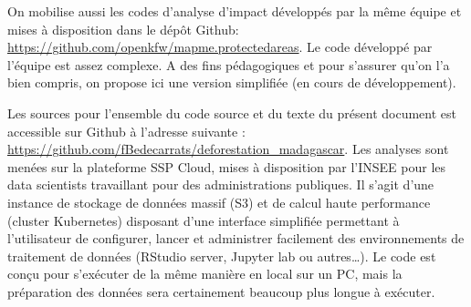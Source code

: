 \documentclass[
  letterpaper,
  DIV=11,
  numbers=noendperiod]{scrreprt}
\begin{document}
On mobilise aussi les codes d'analyse d'impact développés par la même
équipe et mises à disposition dans le dépôt Github:
\url{https://github.com/openkfw/mapme.protectedareas}. Le code développé
par l'équipe est assez complexe. A des fins pédagogiques et pour
s'assurer qu'on l'a bien compris, on propose ici une version simplifiée
(en cours de développement).

Les sources pour l'ensemble du code source et du texte du présent
document est accessible sur Github à l'adresse suivante :
\url{https://github.com/fBedecarrats/deforestation_madagascar}. Les
analyses sont menées sur la plateforme SSP Cloud, mises à disposition
par l'INSEE pour les data scientists travaillant pour des
administrations publiques. Il s'agit d'une instance de stockage de
données massif (S3) et de calcul haute performance (cluster Kubernetes)
disposant d'une interface simplifiée permettant à l'utilisateur de
configurer, lancer et administrer facilement des environnements de
traitement de données (RStudio server, Jupyter lab ou autres\ldots). Le
code est conçu pour s'exécuter de la même manière en local sur un PC,
mais la préparation des données sera certainement beaucoup plus longue à
exécuter.
\end{document}

